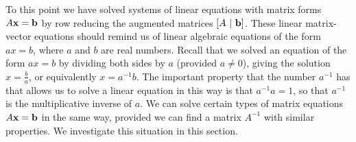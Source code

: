 
To this point we have solved systems of linear equations with matrix forms $A \mathbf{x} = \mathbf{b}$ by row reducing the augmented matrices $[A \ | \ \mathbf{b}]$. These linear matrix-vector equations should remind us of linear algebraic equations of the form $ax = b$, where $a$ and $b$ are real numbers. Recall that we solved an equation of the form $ax=b$ by dividing both sides by $a$ (provided $a \neq 0$), giving the solution $x = \frac{b}{a}$, or equivalently $x = a^{-1}b$. The important property that the number $a^{-1}$ has that allows us to solve a linear equation in this way is that $a^{-1}a = 1$, so that $a^{-1}$ is the multiplicative inverse of $a$. We can solve certain types of matrix equations $A \mathbf{x} = \mathbf{b}$ in the same way, provided we can find a matrix $A^{-1}$ with similar properties. We investigate this situation in this section.

